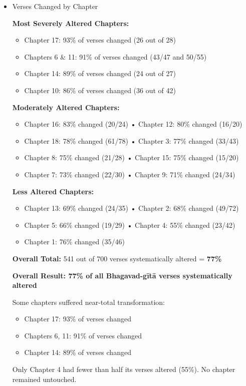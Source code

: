 \documentclass[11pt,twoside]{book}
\begin{document}
\newpage
\begin{itemize}
\item Verses Changed by Chapter
\label{sec:org2fe47f9}

\textbf{\textbf{Most Severely Altered Chapters:}}
\begin{itemize}
\item Chapter 17: 93\% of verses changed (26 out of 28)
\item Chapters 6 \& 11: 91\% of verses changed (43/47 and 50/55)
\item Chapter 14: 89\% of verses changed (24 out of 27)
\item Chapter 10: 86\% of verses changed (36 out of 42)
\end{itemize}

\textbf{\textbf{Moderately Altered Chapters:}}
\begin{itemize}
\item Chapter 16: 83\% changed (20/24) • Chapter 12: 80\% changed (16/20)
\item Chapter 18: 78\% changed (61/78) • Chapter 3: 77\% changed (33/43)
\item Chapter 8: 75\% changed (21/28) • Chapter 15: 75\% changed (15/20)
\item Chapter 7: 73\% changed (22/30) • Chapter 9: 71\% changed (24/34)
\end{itemize}

\textbf{\textbf{Less Altered Chapters:}}
\begin{itemize}
\item Chapter 13: 69\% changed (24/35) • Chapter 2: 68\% changed (49/72)
\item Chapter 5: 66\% changed (19/29) • Chapter 4: 55\% changed (23/42)
\item Chapter 1: 76\% changed (35/46)
\end{itemize}

\textbf{\textbf{Overall Total:}} 541 out of 700 verses systematically altered = \textbf{\textbf{77\%}}

\textbf{\textbf{\textbf{Overall Result: 77\% of all Bhagavad-gītā verses systematically altered}}}

Some chapters suffered near-total transformation:
\begin{itemize}
\item Chapter 17: 93\% of verses changed
\item Chapters 6, 11: 91\% of verses changed
\item Chapter 14: 89\% of verses changed
\end{itemize}

Only Chapter 4 had fewer than half its verses altered (55\%). No chapter remained untouched.
\end{itemize}
\end{document}
